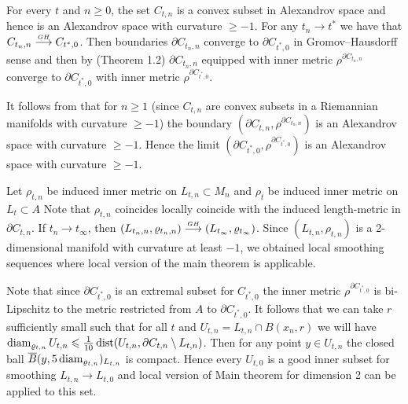 For every $t$ and $n\ge 0$, the set $C_{t,n}$ is a convex subset in Alexandrov space 
 and hence is an Alexandrov space 
 with curvature $\ge -1$.
For any $t_n\to t^*$ we have that
$C_{t_n,n}     \stackrel{\hbox{\tiny $GH$}}{\longrightarrow}    C_{t^*,0} $. 
Then boundaries  $\partial C_{t_n,n}  $
  converge to $\partial C_{t^*,0}  $ in
Gromov--Hausdorff sense and then by  
  \cite{petrunin-QG} (Theorem 1.2)
 $\partial C_{t_n, n}  $ equipped with inner metric
 $\rho^{\partial C_{t_n,n}}$ converge to
 $\partial C_{t^*,0}  $ with inner metric
 $\rho^{\partial C_{t^*,0}}$.
 
 
 It follows from \cite{AKP} that
 for $n\ge 1$
  (since $C_{t,n}$ are
 convex subsets in a Riemannian manifolds with curvature $\ge -1$)
  the boundary
$(\partial C_{t,n}, \rho^{\partial C_{t_n,n}}) $ is
an Alexandrov space 
 with curvature $\ge -1$. Hence the limit
$(\partial C_{t^*,0}, \rho^{\partial C_{t^*,0}}) $ is
an Alexandrov space 
 with curvature $\ge -1$.

Let $\rho_{t,n}$ be induced inner metric on $L_{t,n}\subset M_n$ and $\rho_{t}$ be induced inner metric on $L_{t}\subset A$
Note that $\rho_{t,n}$ coincides locally coincide with the induced length-metric in 
$\partial C_{t,n}$.
If $t_n\to t_\infty$, then 
$(L_{t_n,n}, \varrho_{t_n,n})\stackrel{\hbox{\tiny $GH$}}{\longrightarrow} (L_{t_\infty},\varrho_{t_\infty})$.
Since $(L_{t,n}, \rho_{t,n})$ is a 2-dimensional manifold with curvature at least $-1$,
we obtained local smoothing sequences where local version of the main theorem is applicable.

Note that since 
$\partial C_{t^*,0}$
is an extremal subset for
$C_{t^*,0}$
 the inner metric
$ \rho^{\partial C_{t^*,0}} $ is bi-Lipschitz to
the metric restricted from $A$ to
$\partial C_{t^*,0}$.
It follows that
we can take $r$ sufficiently small
such that for all $t$ and
$U_{t,n}=L_{t,n}\cap B(x_n,r)$
we will have
$\operatorname{diam}_{\varrho_{t,n}} U_{t,n}\leqslant \tfrac 1{10} \operatorname{dist}   (U_{t,n},\partial C_{t,n}\setminus L_{t,n})$.
Then for any point $y\in U_{t,n}$ the closed ball
$\overline{B}(y,5\operatorname{diam}_{\varrho_{t,n}})_{L_{t,n}}$ is compact.
Hence every $U_{t,0}$ is a good inner subset for 
smoothing  $L_{t,n}\to L_{t,0}$
and local version of Main theorem for dimension 2
can be applied to this set.

